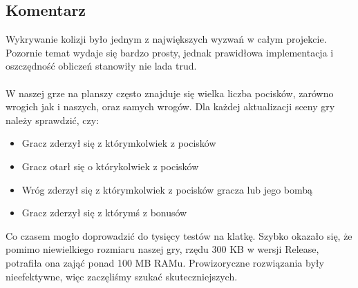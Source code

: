 	\subsection{{\Large Komentarz}}
		\indent \indent Wykrywanie kolizji było jednym z największych wyzwań w całym projekcie. Pozornie temat wydaje się bardzo prosty, jednak prawidłowa implementacja i oszczędność obliczeń stanowiły nie lada trud.\\\\
		\indent W naszej grze na planszy często znajduje się wielka liczba pocisków, zarówno wrogich jak i naszych, oraz samych wrogów. Dla każdej aktualizacji sceny gry należy sprawdzić, czy:
		\begin{itemize}
			\item Gracz zderzył się z którymkolwiek z pocisków
			\item Gracz otarł się o którykolwiek z pocisków
			\item Wróg zderzył się z którymkolwiek z pocisków gracza lub jego bombą
			\item Gracz zderzył się z którymś z bonusów
		\end{itemize}
		Co czasem mogło doprowadzić do tysięcy testów na klatkę. Szybko okazało się, że pomimo niewielkiego rozmiaru naszej gry, rzędu 300 KB w wersji Release, potrafiła ona zająć ponad 100 MB RAMu. Prowizoryczne rozwiązania były nieefektywne, więc zaczęliśmy szukać skuteczniejszych.
